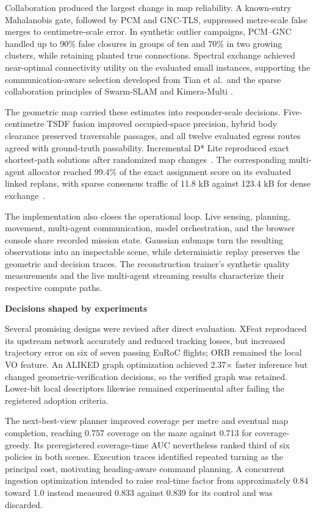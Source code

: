 \documentclass[10pt,a4paper]{article}
\newcommand{\indentedheading}[1]{\par\addvspace{0.65em}\noindent\hspace*{1em}\textbf{#1}\par\smallskip}
\begin{document}
Collaboration produced the largest change in map reliability.
A known-entry Mahalanobis gate, followed by PCM and GNC-TLS,
suppressed metre-scale false merges to centimetre-scale error.
In synthetic outlier campaigns, PCM--GNC handled up to 90\%
false closures in groups of ten and 70\% in two growing
clusters, while retaining planted true connections. Spectral
exchange achieved near-optimal connectivity utility on the
evaluated small instances, supporting the communication-aware
selection developed from Tian et al.\ and the sparse
collaboration principles of Swarm-SLAM and Kimera-Multi
\cite{tian2018near,lajoie2024swarmslam,tian2022kimeramulti}.

The geometric map carried these estimates into responder-scale
decisions. Five-centimetre TSDF fusion improved occupied-space
precision, hybrid body clearance preserved traversable passages,
and all twelve evaluated egress routes agreed with ground-truth
passability. Incremental D* Lite reproduced exact shortest-path
solutions after randomized map changes~\cite{dstar2002}.
The corresponding multi-agent allocator reached 99.4\% of
the exact assignment score on its evaluated linked replans,
with sparse consensus traffic of 11.8 kB against 123.4 kB
for dense exchange~\cite{cbba}.

The implementation also closes the operational loop. Live
sensing, planning, movement, multi-agent communication, model
orchestration, and the browser console share recorded mission
state. Gaussian submaps turn the resulting observations into
an inspectable scene, while deterministic replay preserves
the geometric and decision traces. The reconstruction trainer's
synthetic quality measurements and the live multi-agent streaming
results characterize their respective compute paths.

\indentedheading{Decisions shaped by experiments}

Several promising designs were revised after direct evaluation.
XFeat reproduced its upstream network accurately and reduced
tracking losses, but increased trajectory error on six of seven
passing EuRoC flights; ORB remained the local VO feature.
An ALIKED graph optimization achieved 2.37$\times$ faster
inference but changed geometric-verification decisions, so
the verified graph was retained. Lower-bit local descriptors
likewise remained experimental after failing the registered
adoption criteria.

The next-best-view planner improved coverage per metre and
eventual map completion, reaching 0.757 coverage on the maze
against 0.713 for coverage-greedy. Its preregistered
coverage-time AUC nevertheless ranked third of six policies
in both scenes. Execution traces identified repeated turning
as the principal cost, motivating heading-aware command
planning. A concurrent ingestion optimization intended to
raise real-time factor from approximately 0.84 toward 1.0
instead measured 0.833 against 0.839 for its control and
was discarded.
\end{document}
